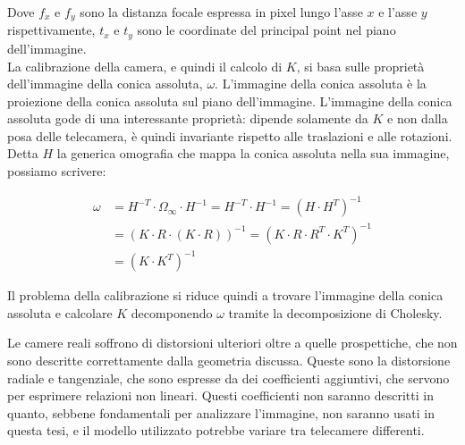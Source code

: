 Dove $f_x$ e $f_y$ sono la distanza focale espressa in pixel lungo l'asse $x$ e l'asse $y$ rispettivamente, $t_x$ e $t_y$ sono le coordinate del principal point nel piano dell'immagine. \\

La calibrazione della camera, e quindi il calcolo di $K$, si basa sulle proprietà dell'immagine della conica assoluta, $\omega$.
L'immagine della conica assoluta è la proiezione della conica assoluta sul piano dell'immagine. L'immagine della conica assoluta gode di una interessante proprietà: dipende solamente da $K$ e non dalla posa delle telecamera, è quindi invariante rispetto alle traslazioni e alle rotazioni. Detta $H$ la generica omografia che mappa la conica assoluta nella sua immagine, possiamo scrivere:

\begin{equation*}
 \begin{split}
  \omega &= H^{-T}\cdot\Omega_\infty\cdot H^{-1} = H^{-T}\cdot H^{-1} = \left( H\cdot H^T \right)^{-1} \\
         &= \left( K\cdot R\cdot \left( K\cdot R \right)\right)^{-1} =  \left( K\cdot R\cdot R^T \cdot K^T \right)^{-1} \\
         &= \left( K\cdot K^T \right)^{-1}
 \end{split}
\end{equation*}

Il problema della calibrazione si riduce quindi a trovare l'immagine della conica assoluta e calcolare $K$ decomponendo $\omega$ tramite la decomposizione di Cholesky.

Le camere reali soffrono di distorsioni ulteriori oltre a quelle prospettiche, che non sono descritte correttamente dalla geometria discussa. Queste sono la distorsione radiale e tangenziale, che sono espresse da dei coefficienti aggiuntivi, che servono per esprimere relazioni non lineari. Questi coefficienti non saranno descritti in quanto, sebbene fondamentali per analizzare l'immagine, non saranno usati in questa tesi, e il modello utilizzato potrebbe variare tra telecamere differenti.



